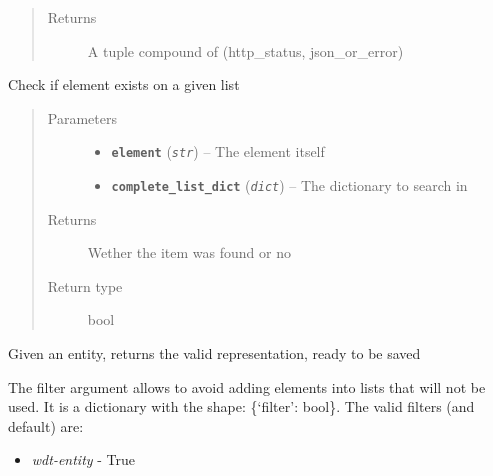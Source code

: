 \documentclass[letterpaper,10pt,english]{sphinxmanual}
\begin{document}
\begin{fulllineitems}
\begin{fulllineitems}
\begin{quote}
\begin{description}
\item[{Returns}] \leavevmode
A tuple compound of (http\_status, json\_or\_error)

\end{description}\end{quote}

\end{fulllineitems}


\begin{fulllineitems}
\label{index:dataset.Dataset.exist_element}
Check if element exists on a given list
\begin{quote}\begin{description}
\item[{Parameters}] \leavevmode\begin{itemize}
\item {} 
\textbf{\texttt{element}} (\emph{\texttt{str}}) -- The element itself

\item {} 
\textbf{\texttt{complete\_list\_dict}} (\emph{\texttt{dict}}) -- The dictionary to search in

\end{itemize}

\item[{Returns}] \leavevmode
Wether the item was found or no

\item[{Return type}] \leavevmode
bool

\end{description}\end{quote}

\end{fulllineitems}


\begin{fulllineitems}
\label{index:dataset.Dataset.extract_entity}
Given an entity, returns the valid representation, ready to be saved

The filter argument allows to avoid adding elements into lists that
will not be used. It is a dictionary with the shape: \{`filter': bool\}.
The valid filters (and default) are:
\begin{itemize}
\item {} 
\emph{wdt-entity} - True


\end{itemize}
\end{fulllineitems}
\end{fulllineitems}
\end{document}
